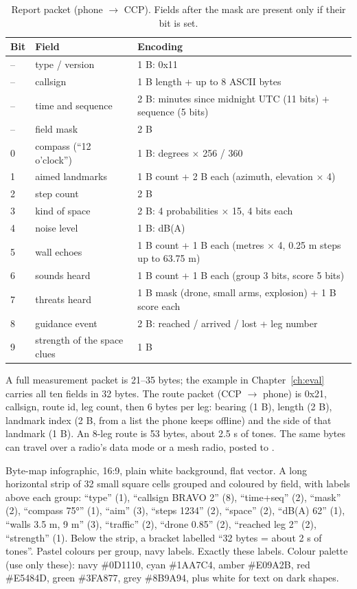 \begin{table}[htbp]\centering\small
\caption{Report packet (phone $\rightarrow$ CCP). Fields after the mask are present only if their bit is set.}\label{tab:packet}
\begin{tabularx}{\linewidth}{llX}
\toprule
Bit & Field & Encoding\\
\midrule
-- & type / version & 1 B: 0x11\\
-- & callsign & 1 B length + up to 8 ASCII bytes\\
-- & time and sequence & 2 B: minutes since midnight UTC (11 bits) + sequence (5 bits)\\
-- & field mask & 2 B\\
0 & compass (``12 o'clock'') & 1 B: degrees $\times$ 256 / 360\\
1 & aimed landmarks & 1 B count + 2 B each (azimuth, elevation $\times$ 4)\\
2 & step count & 2 B\\
3 & kind of space & 2 B: 4 probabilities $\times$ 15, 4 bits each\\
4 & noise level & 1 B: dB(A)\\
5 & wall echoes & 1 B count + 1 B each (metres $\times$ 4, 0.25 m steps up to 63.75 m)\\
6 & sounds heard & 1 B count + 1 B each (group 3 bits, score 5 bits)\\
7 & threats heard & 1 B mask (drone, small arms, explosion) + 1 B score each\\
8 & guidance event & 2 B: reached / arrived / lost + leg number\\
9 & strength of the space clues & 1 B\\
\bottomrule
\end{tabularx}
\end{table}

A full measurement packet is 21--35 bytes; the example in Chapter~\ref{ch:eval} carries all ten fields in 32 bytes. The route
packet (CCP $\rightarrow$ phone) is 0x21, callsign, route id, leg count, then 6 bytes per leg: bearing (1 B), length (2 B),
landmark index (2 B, from a list the phone keeps offline) and the side of that landmark (1 B). An 8-leg route is 53 bytes,
about 2.5 s of tones. The same bytes can travel over a radio's data mode or a mesh radio, posted to .

{Byte-map infographic, 16:9, plain white background, flat vector. A long horizontal strip of 32 small square cells grouped and
coloured by field, with labels above each group: ``type'' (1), ``callsign BRAVO 2'' (8), ``time+seq'' (2), ``mask'' (2),
``compass 75°'' (1), ``aim'' (3), ``steps 1234'' (2), ``space'' (2), ``dB(A) 62'' (1), ``walls 3.5 m, 9 m'' (3), ``traffic''
(2), ``drone 0.85'' (2), ``reached leg 2'' (2), ``strength'' (1). Below the strip, a bracket labelled ``32 bytes = about 2 s of
tones''. Pastel colours per group, navy labels. Exactly these labels. Colour palette (use only these): navy \#0D1110, cyan \#1AA7C4, amber \#E09A2B, red \#E5484D, green \#3FA877, grey \#8B9A94, plus white for text on dark shapes.}

